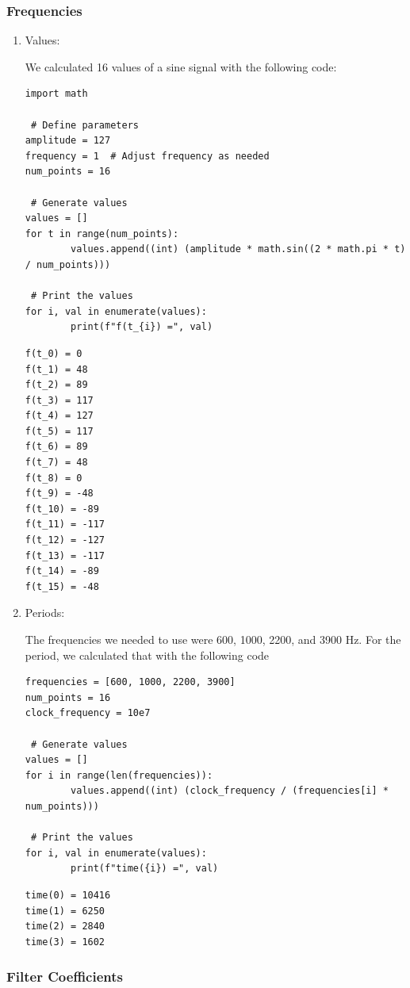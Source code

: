 \documentclass[a4paper, 12pt]{article}
\begin{document}
\subsubsection{Frequencies}
\label{sec:org07665be}
\begin{enumerate}
\item Values:
\label{sec:orge094095}

We calculated 16 values of a sine signal with the following code:

\begin{verbatim}
import math

 # Define parameters
amplitude = 127
frequency = 1  # Adjust frequency as needed
num_points = 16

 # Generate values
values = []
for t in range(num_points):
        values.append((int) (amplitude * math.sin((2 * math.pi * t) / num_points)))

 # Print the values
for i, val in enumerate(values):
        print(f"f(t_{i}) =", val)
\end{verbatim}

\begin{verbatim}
f(t_0) = 0
f(t_1) = 48
f(t_2) = 89
f(t_3) = 117
f(t_4) = 127
f(t_5) = 117
f(t_6) = 89
f(t_7) = 48
f(t_8) = 0
f(t_9) = -48
f(t_10) = -89
f(t_11) = -117
f(t_12) = -127
f(t_13) = -117
f(t_14) = -89
f(t_15) = -48
\end{verbatim}
\item Periods:
\label{sec:orge38f9c0}

The frequencies we needed to use were 600, 1000, 2200, and 3900 Hz. For the period, we calculated that with the following code

\begin{verbatim}
frequencies = [600, 1000, 2200, 3900]
num_points = 16
clock_frequency = 10e7

 # Generate values
values = []
for i in range(len(frequencies)):
        values.append((int) (clock_frequency / (frequencies[i] * num_points)))

 # Print the values
for i, val in enumerate(values):
        print(f"time({i}) =", val)
\end{verbatim}

\begin{verbatim}
time(0) = 10416
time(1) = 6250
time(2) = 2840
time(3) = 1602
\end{verbatim}
\end{enumerate}
\subsubsection{Filter Coefficients}
\label{sec:org289e7fd}
\end{document}
